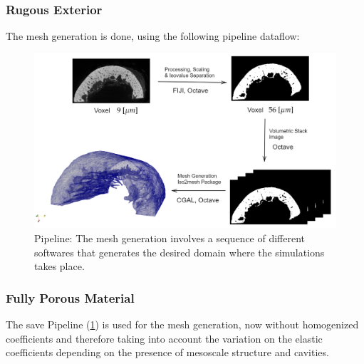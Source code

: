 \subsubsection{Rugous Exterior}
The mesh generation is done, using the following pipeline dataflow:

\begin{figure}[!h]
	\centering
	\includegraphics[scale=.5]{images/ImgExt/DiagramMeshGeneration.png}
	\caption{Pipeline: The mesh generation involves a sequence of different softwares that generates the desired domain where the simulations takes place.}
	\label{DiagramMeshGeneration}
\end{figure} 

\subsubsection{Fully Porous Material}
The save Pipeline (\ref{DiagramMeshGeneration}) is used for the mesh generation, now without homogenized coefficients and therefore taking into account the variation on the elastic coefficients depending on the presence of mesoscale structure and cavities.
